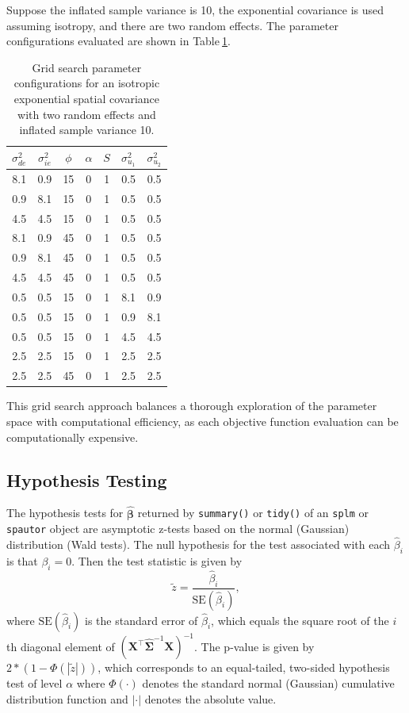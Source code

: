 \documentclass[10pt,letterpaper]{article}
\begin{document}
Suppose the inflated sample variance is 10, the exponential covariance
is used assuming isotropy, and there are two random effects. The
parameter configurations evaluated are shown in
Table\(~\)\ref{tab:grid2}.

\begin{table}
  \centering
  \begin{tabular}{ccccccc}
  \hline
  $\sigma^2_{de}$ & $\sigma^2_{ie}$ & $\phi$ & $\alpha$ & $S$ & $\sigma^2_{u_1}$ & $\sigma^2_{u_2}$ \\
  \hline
  8.1 & 0.9 & 15 & 0 & 1 & 0.5 & 0.5 \\
  0.9 & 8.1 & 15 & 0 & 1 & 0.5 & 0.5 \\
  4.5 & 4.5 & 15 & 0 & 1 & 0.5 & 0.5 \\
  8.1 & 0.9 & 45 & 0 & 1 & 0.5 & 0.5 \\
  0.9 & 8.1 & 45 & 0 & 1 & 0.5 & 0.5 \\
  4.5 & 4.5 & 45 & 0 & 1 & 0.5 & 0.5 \\
  0.5 & 0.5 & 15 & 0 & 1 & 8.1 & 0.9 \\
  0.5 & 0.5 & 15 & 0 & 1 & 0.9 & 8.1 \\
  0.5 & 0.5 & 15 & 0 & 1 & 4.5 & 4.5 \\
  2.5 & 2.5 & 15 & 0 & 1 & 2.5 & 2.5 \\
  2.5 & 2.5 & 45 & 0 & 1 & 2.5 & 2.5 \\
  \hline
  \end{tabular}
  \caption{Grid search parameter configurations for an isotropic exponential spatial covariance with two random effects and inflated sample variance 10.}
  \label{tab:grid2}
\end{table}

This grid search approach balances a thorough exploration of the
parameter space with computational efficiency, as each objective
function evaluation can be computationally expensive.

\hypertarget{hypothesis-testing}{%
\subsection{Hypothesis Testing}\label{hypothesis-testing}}

The hypothesis tests for \(\hat{\boldsymbol{\beta}}\) returned by
\texttt{summary()} or \texttt{tidy()} of an \texttt{splm} or
\texttt{spautor} object are asymptotic z-tests based on the normal
(Gaussian) distribution (Wald tests). The null hypothesis for the test
associated with each \(\hat{\beta}_i\) is that \(\beta_i = 0\). Then the
test statistic is given by \begin{equation*}
  \tilde{z} = \frac{\hat{\beta}_i}{\text{SE}(\hat{\beta}_i)},
\end{equation*} where \(\text{SE}(\hat{\beta}_i)\) is the standard error
of \(\hat{\beta}_i\), which equals the square root of the \(i\)th
diagonal element of
\((\mathbf{X}^\top \hat{\boldsymbol{\Sigma}}^{-1} \mathbf{X})^{-1}\).
The p-value is given by \(2 * (1 - \Phi(|\tilde{z}|))\), which
corresponds to an equal-tailed, two-sided hypothesis test of level
\(\alpha\) where \(\Phi(\cdot)\) denotes the standard normal (Gaussian)
cumulative distribution function and \(|\cdot|\) denotes the absolute
value.
\end{document}
